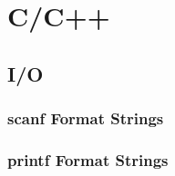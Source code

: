 \section{C/C++}

\subsection{I/O}

\subsubsection{scanf Format Strings}


\subsubsection{printf Format Strings}


